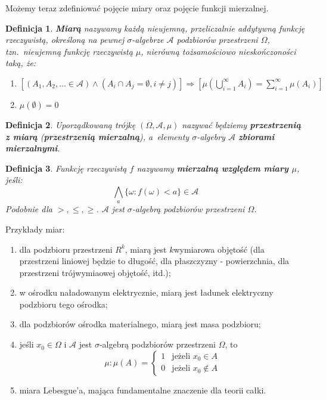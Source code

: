 \documentclass[10pt,a4paper]{article}
\newtheorem{definition}{Definicja}[section]
\begin{document}
Możemy teraz zdefiniować pojęcie miary oraz pojęcie funkcji mierzalnej.
\begin{definition}
  \textbf{Miarą} nazywamy każdą nieujemną, przeliczalnie addytywną funkcję
  rzeczywistą, określoną na pewnej $\sigma$-algebrze $\mathscr{A}$ podzbiorów
  przestrzeni $\Omega$, tzn.\ nieujemną funkcję rzeczywistą $\mu$, nierówną
  tożsamościowo nieskończoności taką, że:
  \begin{enumerate}
    \item $[(A_1,A_2,\dotsc\in\mathscr{A})\land(A_i\cap A_j=\emptyset,i\neq j)]
      \Longrightarrow \left[\mu(\bigcup_{i=1}^{\infty}A_i)=\sum_{i=1}^{\infty}\mu(A_i)\right]$
    \item $\mu(\emptyset)=0$
  \end{enumerate}
\end{definition}

\begin{definition}
  Uporządkowaną trójkę $(\Omega, \mathscr{A}, \mu)$ nazywać będziemy
  \textbf{przestrzenią z miarą} (\textbf{przestrzenią mierzalną}), a~elementy
  $\sigma$-algebry $\mathscr{A}$ \textbf{zbiorami mierzalnymi}.
\end{definition}

\begin{definition}
  Funkcję rzeczywistą $f$ nazywamy \textbf{mierzalną względem miary $\mu$}, jeśli:
  \begin{equation}
    \bigwedge_a\{\omega: f(\omega)<a\}\in \mathscr{A}
  \end{equation}
  Podobnie dla $>,\leq,\geq$. $\mathscr{A}$ jest $\sigma$-algebrą podzbiorów przestrzeni $\Omega$.
\end{definition}

Przykłady miar:
\begin{enumerate}
  \item dla podzbioru przestrzeni $R^k$, miarą jest $k$\dywiz wymiarowa objętość
    (dla przestrzeni liniowej będzie to długość, dla płaszczyzny - powierzchnia,
    dla przestrzeni trójwymiaowej objętość, itd.);
  \item w ośrodku naładowanym elektrycznie, miarą jest ładunek elektryczny
    podzbioru tego ośrodka;
  \item dla podzbiorów ośrodka materialnego, miarą jest masa podzbioru;
  \item jeśli $x_0\in\Omega$ i $\mathscr{A}$ jest $\sigma$-algebrą podzbiorów
    przestrzeni $\Omega$, to
    \[
      \mu: \mu(A) = \left\{ \begin{array}{ll}
      1 & \textrm{jeżeli $x_0\in A$}\\
      0 & \textrm{jeżeli $x_0\notin A$}
      \end{array} \right.
    \]
  \item miara Lebesgue'a, mająca fundamentalne znaczenie dla teorii całki.
\end{enumerate}
\end{document}
